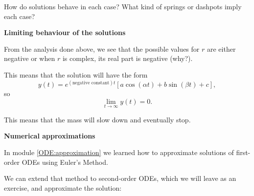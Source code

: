 How do solutions behave in each case?
What kind of springs or dashpots imply each case?





\hfill

\begin{center}
\textbf{\color{cyan}
Limiting behaviour of the solutions
}
\end{center}


From the analysis done above, we see that the possible values for $r$ are either negative or when $r$ is complex, its real part is negative (why?).

This means that the solution will have the form
$$
y(t) = e^{(\text{negative constant}) t} \left[  a\cos(\alpha t) + b\sin(\beta t) + c\right],
$$
so 
$$
\lim_{t \to \infty} y(t) = 0.
$$

This means that the mass will slow down and eventually stop.


\hfill

\begin{center}
\textbf{\color{cyan}
Numerical approximations
}
\end{center}



In module \ref{ODE:approximation} we learned how to approximate solutions of first-order ODEs using Euler's Method.

We can extend that method to second-order ODEs, which we will leave as an exercise, and approximate the solution:

